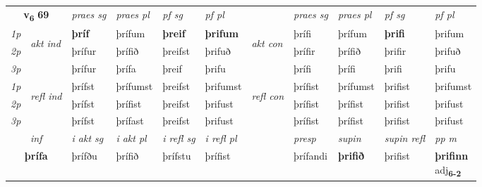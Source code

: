 \noindent
\begin{tabular}{lllllllllll} \toprule
\multicolumn{2}{c}{\textbf{v{\textsubscript{6}}} \Large{\textbf{69}}}  &  \textit{praes sg}  & \textit{praes pl}  &\textit{ pf sg} & \textit{pf pl} &  &  \textit{praes sg}  & \textit{praes pl}  & \textit{pf sg} & \textit{pf pl } \\*
	\cmidrule{3-6} \cmidrule{8-11}
 {\textit{1p}} & \multirow{3}{*}{\begin{turn}{90}\textit{akt ind}\end{turn}} & \textbf{þríf} & þrífum & \textbf{þreif} & \textbf{þrifum} & \multirow{3}{*}{\begin{turn}{90}\textit{akt con}\end{turn}} &þrífi & þrífum & \textbf{þrifi} & þrifum\\*
 {\textit{2p}} &  &  þrífur  & þrífið & þreifst & þrifuð & & þrífir & þrífið & þrifir & þrifuð \\*
{\textit{3p}} &  & þrífur & þrífa & þreif & þrifu & & þrífi & þrífi& þrifi & þrifu \\*
\cmidrule{3-6} \cmidrule{8-11}
 {\textit{1p}} & \multirow{3}{*}{\begin{turn}{90}\textit{refl ind}\end{turn}}  & þrífst & þrífumst & þreifst & þrifumst & \multirow{3}{*}{\begin{turn}{90}\textit{refl con}\end{turn}}  &þrífist & þrífumst & þrifist & þrifumst \\*
 {\textit{2p}} &  & þrífst & þrífist & þreifst & þrifust & &þrífist & þrífist & þrifist & þrifust \\*
 {\textit{3p}}  & & þrífst & þrífast & þreifst & þrifust & & þrífist & þrífist& þrifist & þrifust \\*
\cmidrule{3-6} \cmidrule{8-11}

   \multicolumn{2}{c}{\textit{inf}}  & \textit{i akt sg} & \textit{i akt pl} & \textit{i refl sg} & \textit{i refl pl} && \textit{presp} & \textit{supin} & \textit{supin refl} & \textit{pp m} \\*
  \multicolumn{2}{c}{\textbf{þrífa}} & þrífðu  & þrífið & þrífstu & þrífist && þrífandi &  \textbf{þrifið} & þrifist & \specialcell{\textbf{þrifinn} \\ adj\textbf{\textsubscript{6-2}}} \\*
\end{tabular}

